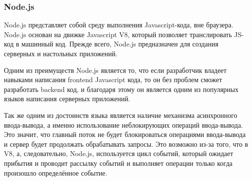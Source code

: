 \subsubsection{Node.js}

Node.js представляет собой среду выполнения Javascript-кода, вне браузера. Node.js основан на движке Javascript V8, который позволяет транслировать JS-код в машинный код. Прежде всего, Node.js предназначен для создания серверных и настольных приложений.

Одним из преимуществ Node.js является то, что если разработчик владеет навыками написания frontend Javascript кода, то он без проблем сможет разработать backend код, и благодаря этому он является одним из популярных языков написания серверных приложений.

Так же одним из достоинств языка является наличие механизма асинхронного ввода-вывода, а именно использование неблокирующих операций ввода-вывода. Это значит, что главный поток не будет блокироваться операциями ввода-вывода и сервер будет продолжать обрабатывать запросы. Это возможно из-за того, что в V8, а, следовательно, Node.js, используется цикл событий, который ожидает прибытия и проводит рассылку событий и выполняет операции только когда произошло определённое событие.

